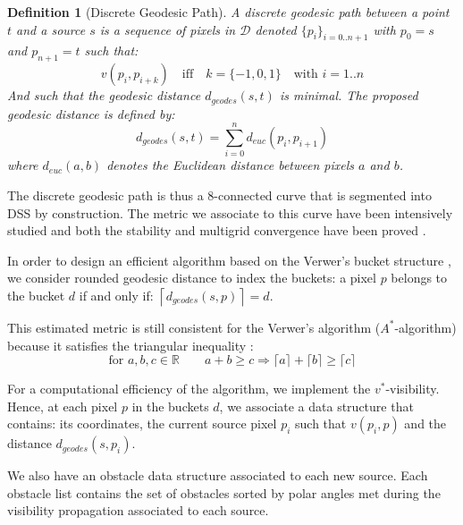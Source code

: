 \documentclass[fleqn,twoside]{article}
\newtheorem{defi}{Definition}
\begin{document}
\begin{defi}[Discrete Geodesic Path]
  A discrete geodesic   path between a  point  $t$ and  a source   $s$ is  a sequence   of pixels in
  $\mathcal{D}$ denoted $\{p_i\}_{i=0..n+1}$ with $p_0=s$ and $p_{n+1}=t$ such that:
  \begin{equation}
    v(p_{i},p_{i+k})\quad\text{iff}\quad k=\{-1,0,1\}\quad\text{with }i=1..n
  \end{equation}
And such that the geodesic distance $d_{geodes}(s,t)$ is minimal. The
proposed geodesic distance is
defined by:
\begin{equation}
    d_{geodes}(s,t)=\sum_{i=0}^{n} d_{euc}(p_{i},p_{i+1})
  \end{equation}
where $d_{euc}(a,b)$ denotes the Euclidean distance between pixels $a$ and $b$.
\end{defi}

The  discrete geodesic   path is  thus  a  8-connected curve  that  is
segmented into DSS by construction.   The metric we associate to  this
curve  have   been  intensively studied and  both    the stability and
multigrid convergence have been proved \cite{kova,klettePROOF,3Dnss}.

In order to design an efficient algorithm based on the Verwer's bucket
structure  \cite{verwer_uniform},  we  consider  rounded     geodesic
distance to index the buckets: a  pixel $p$ belongs  to the bucket $d$
if and only if: $ \left \lceil d_{geodes}(s,p)\right \rceil=d$.

This estimated metric is  still consistent for the Verwer's  algorithm
($A^*$-algorithm) because it   satisfies  the  triangular   inequality
\cite{moreau,moreauRR}:
\begin{equation}
  \text{for~} a,b,c\in\mathbb{R}\qquad a+b\geq c \Rightarrow \lceil a\rceil+\lceil b\rceil\geq\lceil c\rceil
\end{equation}



For a  computational efficiency  of the   algorithm, we implement  the
$v^*$-visibility.   Hence, at each pixel $p$    in the buckets $d$, we
associate a data structure that contains: its coordinates, the current
source  pixel   $p_i$  such   that    $v(p_i,p)$  and  the    distance
$d_{geodes}(s,p_i)$.

We  also   have an obstacle   data  structure associated   to each new
source.  Each obstacle list contains   the set of obstacles sorted  by
polar angles met during the  visibility propagation associated to each
source.
\end{document}
